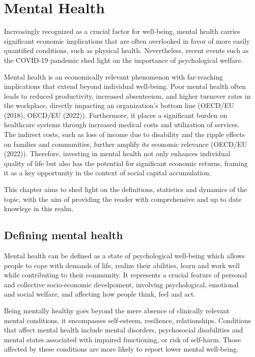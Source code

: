 \chapter{Mental Health}

Increasingly recognized as a crucial factor for well-being, mental health carries significant economic implications that are often overlooked in favor of more easily quantified conditions, such as physical health. Nevertheless, recent events such as the COVID-19 pandemic shed light on the importance of psychological welfare. 

Mental health is an economically relevant phenomenon with far-reaching implications that extend beyond individual well-being. Poor mental health often leads to reduced productivity, increased absenteeism, and higher turnover rates in the workplace, directly impacting an organization's bottom line (OECD/EU (2018), OECD/EU (2022)). Furthermore, it places a significant burden on healthcare systems through increased medical costs and utilization of services. The indirect costs, such as loss of income due to disability and the ripple effects on families and communities, further amplify its economic relevance (OECD/EU (2022)). Therefore, investing in mental health not only enhances individual quality of life but also has the potential for significant economic returns, framing it as a key opportunity in the context of social capital accumulation.

This chapter aims to shed light on the definitions, statistics and dynamics of the topic, with the aim of providing the reader with comprehensive and up to date knowlege in this realm. 

\section{Defining mental health}
Mental health can be defined as a state of psychological well-being which allows people to cope with demands of life, realize their abilities, learn and work well while contributing to their community. It represents a crucial feature of personal and collective socio-economic develpoment, involving psychological, emotional and social welfare, and affecting how people think, feel and act. 

Being mentally healthy goes beyond the mere absence of clinically relevant mental conditions, it encompasses self-esteem, resilience, relationships. 
Conditions that affect mental health include mental disorders, psychosocial disabilities and mental states associated with impaired functioning, or risk of self-harm. Those affected by these conditions are more likely to report lower mental well-being. 

